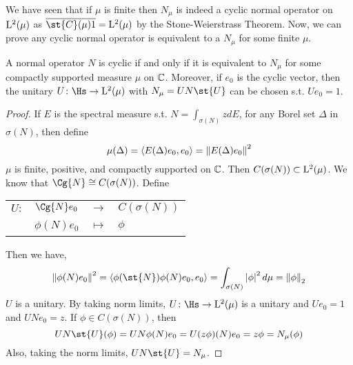We have seen that if $\mu$ is finite then $N_{\mu}$ is indeed a cyclic normal operator on $\mathrm{L^{2}}(\mu)$ as $\clo{\st{C}(\mu)1} = \lfs{2}(\mu)$ by the Stone-Weierstrass Theorem. Now, we can prove any cyclic normal operator is equivalent to a $N_{\mu}$ for some finite $\mu$.
\begin{thm}
	A normal operator $N$ is cyclic if and only if it is equivalent to $N_{\mu}$ for some compactly supported measure $\mu$ on $\mathbb{C}$. Moreover, if $e_0$ is the cyclic vector, then the unitary $U \colon \Hs \sto \lfs{2}(\mu)$ with $N_{\mu} = UN\st{U}$ can be chosen s.t. $Ue_0 = 1$.
\end{thm}
\begin{proof}
	If $E$ is the spectral measure s.t. $N = \int_{\sigma(N)} z dE$, for any Borel set $\Delta$ in $\sigma(N)$, then define
	\begin{equation*}
		\mu(\Delta) = \langle E(\Delta)e_0,e_0 \rangle = \left\lVert E(\Delta)e_0\right\lVert^2
	\end{equation*}
	$\mu$ is finite, positive, and compactly supported on $\mathbb{C}$. Then $C(\sigma(N)) \subset \mathrm{L^{2}}(\mu)$. We know that $\Cg{N} \cong C(\sigma(N))$. Define
	\begin{center}
		\begin{tabular}{l c c l}
			$U \colon$ & $\Cg{N}e_0$ & $\longrightarrow$ & $C(\sigma(N))$ \\
			~ & $\phi(N)e_0$ & $\longmapsto$ & $\phi$
		\end{tabular}
	\end{center}
	Then we have,
	\begin{equation*}
		\norm{\phi(N)e_0}^2 = \langle \phi(\st{N})\phi(N)e_0,e_0 \rangle = \int_{\sigma(N)} \abs{\phi}^2 d\mu = \norm{\phi}_2
	\end{equation*}
	$U$ is a unitary. By taking norm limits, $U \colon \Hs \sto \lfs{2}(\mu)$ is a unitary and $Ue_0 = 1$ and $UNe_0 = z$. If $\phi \in C(\sigma(N))$, then
	\begin{equation*}
		UN\st{U}(\phi) = UN\phi(N)e_0 = U(z\phi)(N)e_0 = z\phi = N_{\mu}(\phi)
	\end{equation*}
	Also, taking the norm limits, $UN\st{U}=N_{\mu}$.
\end{proof}

